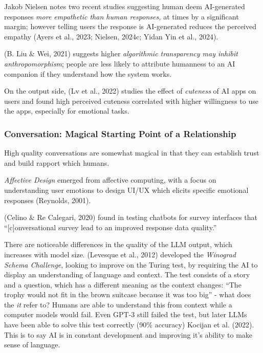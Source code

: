 \documentclass[
  letterpaper,
  DIV=11,
  numbers=noendperiod]{scrartcl}
\begin{document}
Jakob Nielsen notes two recent studies suggesting human deem
AI-generated responses \emph{more empathetic than human responses,} at
times by a significant margin; however telling users the response is
AI-generated reduces the perceived empathy (Ayers et al., 2023; Nielsen,
2024c; Yidan Yin et al., 2024).

(B. Liu \& Wei, 2021) suggests higher \emph{algorithmic transparency may
inhibit anthropomorphism}; people are less likely to attribute humanness
to an AI companion if they understand how the system works.

On the output side, (Lv et al., 2022) studies the effect of
\emph{cuteness} of AI apps on users and found high perceived cuteness
correlated with higher willingness to use the apps, especially for
emotional tasks.

\subsubsection{Conversation: Magical Starting Point of a
Relationship}\label{conversation-magical-starting-point-of-a-relationship}

High quality conversations are somewhat magical in that they can
establish trust and build rapport which humans.

\emph{Affective Design} emerged from affective computing, with a focus
on understanding user emotions to design UI/UX which elicits specific
emotional responses (Reynolds, 2001).

(Celino \& Re Calegari, 2020) found in testing chatbots for survey
interfaces that ``{[}c{]}onversational survey lead to an improved
response data quality.''

There are noticeable differences in the quality of the LLM output, which
increases with model size. (Levesque et al., 2012) developed the
\emph{Winograd Schema Challenge}, looking to improve on the Turing test,
by requiring the AI to display an understanding of language and context.
The test consists of a story and a question, which has a different
meaning as the context changes: ``The trophy would not fit in the brown
suitcase because it was too big'' - what does the \emph{it} refer to?
Humans are able to understand this from context while a computer models
would fail. Even GPT-3 still failed the test, but later LLMs have been
able to solve this test correctly (90\% accuracy) Kocijan et al. (2022).
This is to say AI is in constant development and improving it's ability
to make sense of language.
\end{document}
